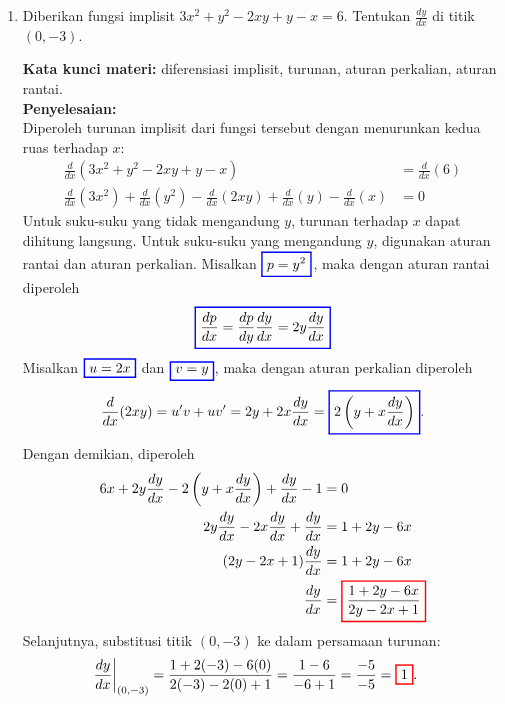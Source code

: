 \documentclass[10pt,openany,a4paper]{article}
\theoremstyle{definition}
\theoremstyle{definition}
\theoremstyle{plain}
\newenvironment{jawab}[2][tes]{%
\par\noindent\textbf{Kata kunci materi:} #1.\\
\textbf{Penyelesaian:} #2%
}{}
\begin{document}
\begin{enumerate}
    \item Diberikan fungsi implisit \(3x^2 + y^2 - 2xy + y - x = 6\). Tentukan \(\frac{dy}{dx}\) di titik \((0,-3)\).
    \begin{jawab}[diferensiasi implisit, turunan, aturan perkalian, aturan rantai]{~\\
        Diperoleh turunan implisit dari fungsi tersebut dengan menurunkan kedua ruas terhadap \(x\):
        \begin{align*}
            \frac{d}{dx}(3x^2 + y^2 - 2xy + y - x) &= \frac{d}{dx}(6)\\
            \frac{d}{dx}(3x^2) + \frac{d}{dx}(y^2) - \frac{d}{dx}(2xy) + \frac{d}{dx}(y) - \frac{d}{dx}(x) &= 0
        \end{align*}
        Untuk suku-suku yang tidak mengandung \(y\), turunan terhadap \(x\) dapat dihitung langsung. Untuk suku-suku yang mengandung \(y\), digunakan aturan rantai dan aturan perkalian. Misalkan $\colorlet{oldcolor}{.}
        \color{blue}
        \setlength{\fboxrule}{1pt} \boxed{\color{oldcolor}p=y^2}\color{oldcolor}$, maka dengan aturan rantai diperoleh
        \begin{align*}
            \colorlet{oldcolor}{.}
        \color{blue}
        \setlength{\fboxrule}{1pt} \boxed{\color{oldcolor}\frac{dp}{dx} = \frac{dp}{dy}\frac{dy}{dx} = 2y\frac{dy}{dx}}\color{oldcolor}
        \end{align*}
        Misalkan $\colorlet{oldcolor}{.}
        \color{blue}
        \setlength{\fboxrule}{1pt} \boxed{\color{oldcolor}u=2x}\color{oldcolor}$ dan $\colorlet{oldcolor}{.}
        \color{blue}
        \setlength{\fboxrule}{1pt}\boxed{\color{oldcolor}v=y}\color{oldcolor}$, maka dengan aturan perkalian diperoleh
        \begin{align*}
        \frac{d}{dx}(2xy)=u'v+uv'=2y + 2x\frac{dy}{dx}= \colorlet{oldcolor}{.}
        \color{blue}
        \setlength{\fboxrule}{1pt} \boxed{\color{oldcolor}2\left(y + x\frac{dy}{dx}\right)}\color{oldcolor}.
        \end{align*}
        Dengan demikian, diperoleh
        \begin{align*}
            6x + 2y\frac{dy}{dx} - 2\left(y + x\frac{dy}{dx}\right) + \frac{dy}{dx} - 1 &= 0\\
            2y\frac{dy}{dx}  - 2x\frac{dy}{dx} + \frac{dy}{dx}  &= 1+2y-6x\\
            (2y - 2x + 1)\frac{dy}{dx} &= 1+2y-6x\\
            \frac{dy}{dx} &=
            \colorlet{oldcolor}{.}
        \color{red}
        \setlength{\fboxrule}{1pt} \boxed{\color{oldcolor}\frac{1+2y-6x}{2y - 2x + 1}}\color{oldcolor}
        \end{align*}
        Selanjutnya, substitusi titik \((0,-3)\) ke dalam persamaan turunan:
        \begin{align*}
            \frac{dy}{dx}\bigg|_{(0,-3)} &= \frac{1+2(-3)-6(0)}{2(-3) - 2(0) + 1}= \frac{1-6}{-6 + 1}= \frac{-5}{-5}= \colorlet{oldcolor}{.}
        \color{red}
        \setlength{\fboxrule}{1pt} \boxed{\color{oldcolor}1}\color{oldcolor}.
        \end{align*}
    }
    \end{jawab}


\end{enumerate}
\end{document}
